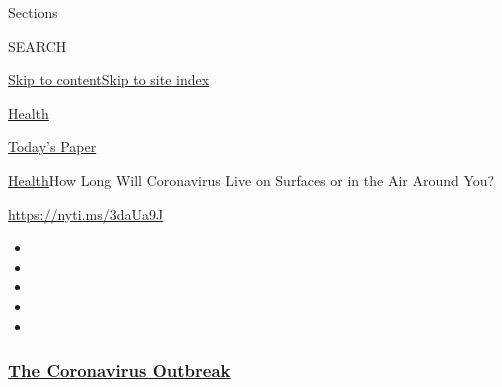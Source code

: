 Sections

SEARCH

\protect\hyperlink{site-content}{Skip to
content}\protect\hyperlink{site-index}{Skip to site index}

\href{https://www.nytimes3xbfgragh.onion/section/health}{Health}

\href{https://myaccount.nytimes3xbfgragh.onion/auth/login?response_type=cookie\&client_id=vi}{}

\href{https://www.nytimes3xbfgragh.onion/section/todayspaper}{Today's
Paper}

\href{/section/health}{Health}\textbar{}How Long Will Coronavirus Live
on Surfaces or in the Air Around You?

\url{https://nyti.ms/3daUa9J}

\begin{itemize}
\item
\item
\item
\item
\item
\end{itemize}

\hypertarget{the-coronavirus-outbreak}{%
\subsubsection{\texorpdfstring{\href{https://www.nytimes3xbfgragh.onion/news-event/coronavirus?name=styln-coronavirus-national\&region=TOP_BANNER\&block=storyline_menu_recirc\&action=click\&pgtype=Article\&impression_id=f9067c50-f1c3-11ea-8fac-d5bd7dfae44a\&variant=undefined}{The
Coronavirus
Outbreak}}{The Coronavirus Outbreak}}\label{the-coronavirus-outbreak}}

